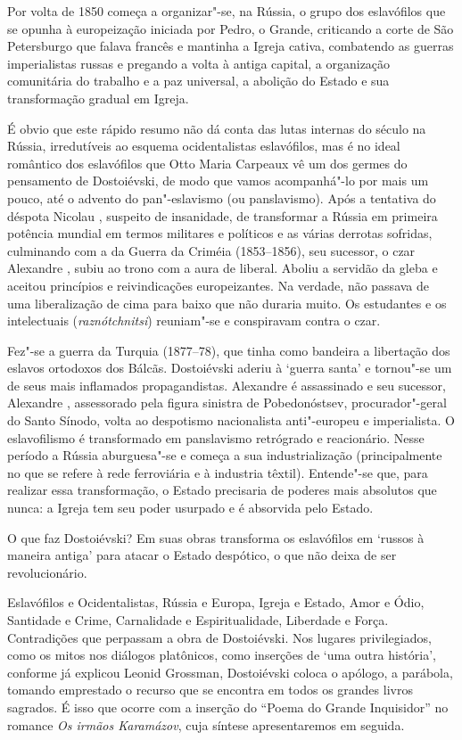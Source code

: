 Por volta de 1850 começa a organizar"-se, na Rússia, o grupo dos
eslavófilos que se opunha à europeização iniciada por Pedro, o Grande,
criticando a corte de São Petersburgo que falava francês e mantinha a
Igreja cativa, combatendo as guerras imperialistas russas e pregando a
volta à antiga capital, a organização comunitária do trabalho e a paz
universal, a abolição do Estado e sua transformação gradual em Igreja.

É obvio que este rápido resumo não dá conta das lutas internas do século
 na Rússia, irredutíveis ao esquema ocidentalistas  eslavófilos, mas
é no ideal romântico dos eslavófilos que Otto Maria Carpeaux vê um dos
germes do pensamento de Dostoiévski, de modo que vamos acompanhá"-lo por
mais um pouco, até o advento do pan"-eslavismo (ou panslavismo). Após a
tentativa do déspota Nicolau , suspeito de insanidade, de transformar a
Rússia em primeira potência mundial em termos militares e políticos e as
várias derrotas sofridas, culminando com a da Guerra da Criméia (1853--1856), seu sucessor, o czar Alexandre , subiu ao trono com a aura
de liberal. Aboliu a servidão da gleba e aceitou princípios e
reivindicações europeizantes. Na verdade, não passava de uma
liberalização de cima para baixo que não duraria muito. Os estudantes e
os intelectuais (\emph{raznótchnitsi}) reuniam"-se e conspiravam contra o czar.

Fez"-se a guerra da Turquia (1877--78), que tinha como bandeira a
libertação dos eslavos ortodoxos dos Bálcãs. Dostoiévski aderiu à
`guerra santa' e tornou"-se um de seus mais inflamados propagandistas.
Alexandre  é assassinado e seu sucessor, Alexandre , assessorado
pela figura sinistra de Pobedonóstsev, procurador"-geral do Santo
Sínodo, volta ao despotismo nacionalista anti"-europeu e imperialista. O
eslavofilismo é transformado em panslavismo retrógrado e reacionário.
Nesse período a Rússia aburguesa"-se e começa a sua industrialização
(principalmente no que se refere à rede ferroviária e à industria
têxtil). Entende"-se que, para realizar essa transformação, o Estado
precisaria de poderes mais absolutos que nunca: a Igreja tem seu poder
usurpado e é absorvida pelo Estado.

O que faz Dostoiévski? Em suas obras transforma os eslavófilos em
`russos à maneira antiga' para atacar o Estado despótico, o que não
deixa de ser revolucionário.

Eslavófilos e Ocidentalistas, Rússia e Europa, Igreja e Estado, Amor e
Ódio, Santidade e Crime, Carnalidade e Espiritualidade, Liberdade e
Força. Contradições que perpassam a obra de Dostoiévski. Nos lugares
privilegiados, como os mitos nos diálogos platônicos, como inserções de
`uma outra história', conforme já explicou Leonid Grossman, Dostoiévski coloca o
apólogo, a parábola, tomando emprestado o recurso que se encontra em
todos os grandes livros sagrados. É isso que ocorre com a inserção do
``Poema do Grande Inquisidor'' no romance \emph{Os irmãos Karamázov}, cuja
síntese apresentaremos em seguida.


